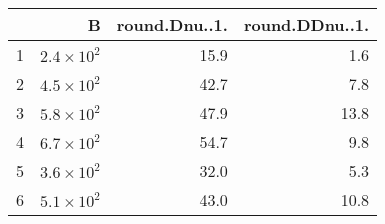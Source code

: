 \begin{table}[ht]
\centering
\begin{tabular}{lrrr}
  \hline
 & B & round.Dnu..1. & round.DDnu..1. \\ 
  \hline
1 & $2.4 \times 10^{2}$ & 15.9 & 1.6 \\ 
  2 & $4.5 \times 10^{2}$ & 42.7 & 7.8 \\ 
  3 & $5.8 \times 10^{2}$ & 47.9 & 13.8 \\ 
  4 & $6.7 \times 10^{2}$ & 54.7 & 9.8 \\ 
  5 & $3.6 \times 10^{2}$ & 32.0 & 5.3 \\ 
  6 & $5.1 \times 10^{2}$ & 43.0 & 10.8 \\ 
   \hline
\end{tabular}
\end{table}
